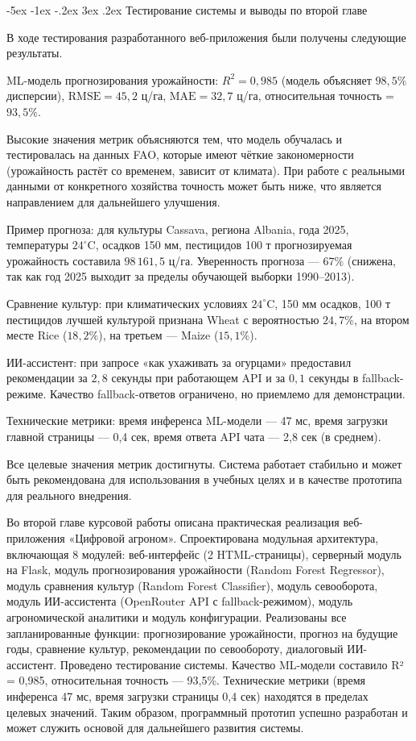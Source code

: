 \documentclass[14pt, a4paper]{extarticle}
\makeatletter
\renewcommand\subsection{\@startsection {subsection}{2}{\z@}%
    {-5ex \@plus -1ex \@minus -.2ex}%
    {3ex \@plus.2ex}%
    {\centering\large\bfseries}}
\makeatother
\begin{document}
\subsection{Тестирование системы и выводы по второй главе}

    В ходе тестирования разработанного веб-приложения были получены следующие результаты.

    ML-модель прогнозирования урожайности: $R^2 = 0{,}985$ (модель объясняет $98{,}5\%$ дисперсии), $\text{RMSE} = 45{,}2$ ц/га, $\text{MAE} = 32{,}7$ ц/га, относительная точность = $93{,}5\%$.

    Высокие значения метрик объясняются тем, что модель обучалась и тестировалась на данных FAO, которые имеют чёткие закономерности (урожайность растёт со временем, зависит от климата). При работе с реальными данными от конкретного хозяйства точность может быть ниже, что является направлением для дальнейшего улучшения.

    Пример прогноза: для культуры Cassava, региона Albania, года 2025, температуры $24^\circ$C, осадков 150 мм, пестицидов 100 т прогнозируемая урожайность составила $98\,161{,}5$ ц/га. Уверенность прогноза — $67\%$ (снижена, так как год 2025 выходит за пределы обучающей выборки 1990–2013).

    Сравнение культур: при климатических условиях $24^\circ$C, 150 мм осадков, 100 т пестицидов лучшей культурой признана Wheat с вероятностью $24{,}7\%$, на втором месте Rice ($18{,}2\%$), на третьем — Maize ($15{,}1\%$).

    ИИ-ассистент: при запросе «как ухаживать за огурцами» предоставил рекомендации за $2{,}8$ секунды при работающем API и за $0{,}1$ секунды в fallback-режиме. Качество fallback-ответов ограничено, но приемлемо для демонстрации.

    Технические метрики: время инференса ML-модели — 47 мс, время загрузки главной страницы — 0,4 сек, время ответа API чата — 2,8 сек (в среднем).

    Все целевые значения метрик достигнуты. Система работает стабильно и может быть рекомендована для использования в учебных целях и в качестве прототипа для реального внедрения.

    Во второй главе курсовой работы описана практическая реализация веб-приложения «Цифровой агроном». Спроектирована модульная архитектура, включающая 8 модулей: веб-интерфейс (2 HTML-страницы), серверный модуль на Flask, модуль прогнозирования урожайности (Random Forest Regressor), модуль сравнения культур (Random Forest Classifier), модуль севооборота, модуль ИИ-ассистента (OpenRouter API с fallback-режимом), модуль агрономической аналитики и модуль конфигурации. Реализованы все запланированные функции: прогнозирование урожайности, прогноз на будущие годы, сравнение культур, рекомендации по севообороту, диалоговый ИИ-ассистент. Проведено тестирование системы. Качество ML-модели составило R² = 0,985, относительная точность — 93,5\%. Технические метрики (время инференса 47 мс, время загрузки страницы 0,4 сек) находятся в пределах целевых значений. Таким образом, программный прототип успешно разработан и может служить основой для дальнейшего развития системы.
\end{document}
